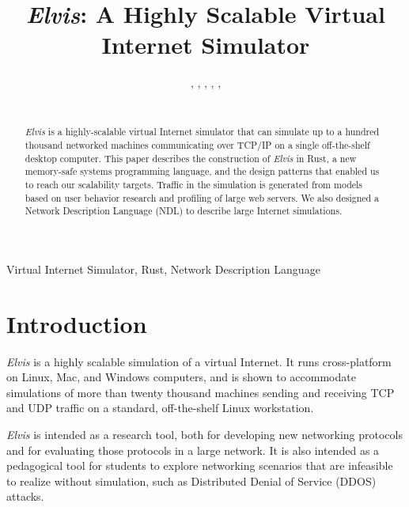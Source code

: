 \documentclass[journal]{IEEEtran} %
\newcommand{\elvis}{\textit{Elvis}}
\begin{document}
\title{\elvis{}: A Highly Scalable Virtual Internet Simulator\\}

\author{%
    ,
    ,
    ,
    ,
    ,
    \\%
    \\%
}

\maketitle

\begin{abstract}
\elvis{} is a highly-scalable virtual Internet simulator that can simulate up to a hundred thousand networked machines communicating over TCP/IP on a single off-the-shelf desktop computer. This paper describes the construction of \elvis{} in Rust, a new memory-safe systems programming language, and the design patterns that enabled us to reach our scalability targets.  Traffic in the simulation is generated from models based on user behavior research and profiling of large web servers. We also designed a Network Description Language (NDL) to describe large Internet simulations.
\end{abstract}

\begin{IEEEkeywords}
    Virtual Internet Simulator, Rust, Network Description Language
\end{IEEEkeywords}

\section{Introduction}
\elvis{} is a highly scalable simulation of a virtual Internet. It runs cross-platform on Linux, Mac, and Windows computers, and is shown to accommodate simulations of more than twenty thousand machines sending and receiving TCP and UDP traffic on a standard, off-the-shelf Linux workstation.

\elvis{} is intended as a research tool, both for developing new networking protocols and for evaluating those protocols in a large network. It is also intended as a pedagogical tool for students to explore networking scenarios that are infeasible to realize without simulation, such as Distributed Denial of Service (DDOS) attacks.
\end{document}
